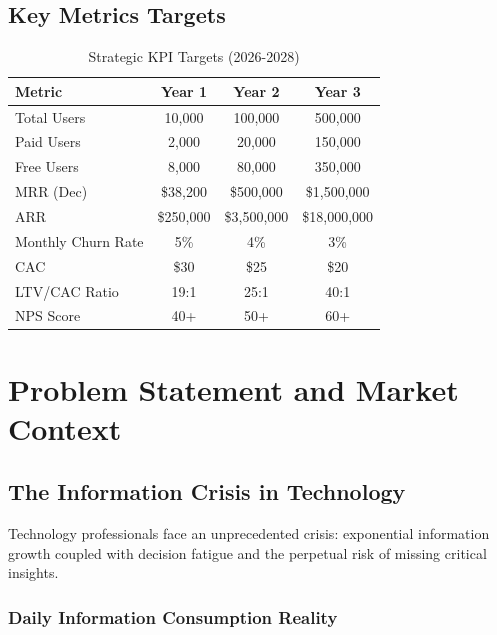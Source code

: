 \documentclass{report}
\begin{document}
\section{Key Metrics Targets}

\begin{table}[h]
\centering
\begin{tabular}{|l|c|c|c|}
\toprule
\textbf{Metric} & \textbf{Year 1} & \textbf{Year 2} & \textbf{Year 3} \\
\midrule
Total Users & 10,000 & 100,000 & 500,000 \\
Paid Users & 2,000 & 20,000 & 150,000 \\
Free Users & 8,000 & 80,000 & 350,000 \\
MRR (Dec) & \$38,200 & \$500,000 & \$1,500,000 \\
ARR & \$250,000 & \$3,500,000 & \$18,000,000 \\
Monthly Churn Rate & 5\% & 4\% & 3\% \\
CAC & \$30 & \$25 & \$20 \\
LTV/CAC Ratio & 19:1 & 25:1 & 40:1 \\
NPS Score & 40+ & 50+ & 60+ \\
\bottomrule
\end{tabular}
\caption{Strategic KPI Targets (2026-2028)}
\end{table}

\newpage

\chapter{Problem Statement and Market Context}

\section{The Information Crisis in Technology}

Technology professionals face an unprecedented crisis: exponential information growth coupled with decision fatigue and the perpetual risk of missing critical insights.

\subsection{Daily Information Consumption Reality}
\end{document}
